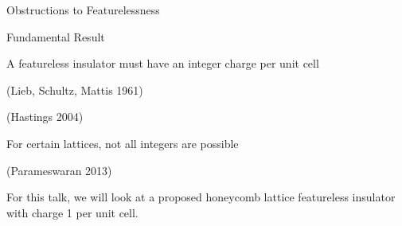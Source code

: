 \begin{frame}{Obstructions to Featurelessness}
\vskip-1cm

\begin{block}{Fundamental Result}
	\bi
		\item[] A featureless insulator must have an integer charge per unit cell
        \bi
	        \item (Lieb, Schultz, Mattis 1961)
	        \item (Hastings 2004)
        \ei
		\item[] For certain lattices, not all integers are possible
		\bi 
			\item (Parameswaran 2013)
		\ei
	\ei
   
\end{block}

For this talk, we will look at a proposed honeycomb lattice featureless insulator with charge 1 per unit cell.

\end{frame}
